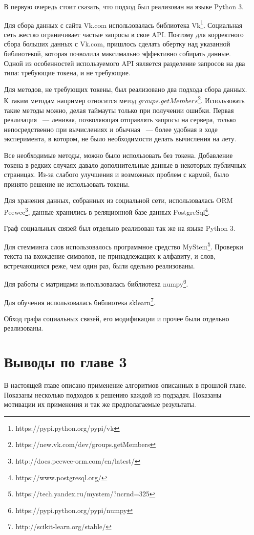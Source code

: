 \documentclass[annotation,times,page4]{itmo-student-thesis}
\begin{document}
В первую очередь стоит сказать, что подход был реализован на языке Python 3.

Для сбора данных с сайта Vk.com использовалась библиотека Vk\footnote{https://pypi.python.org/pypi/vk}. Социальная сеть жестко ограничивает частые запросы в свое API. Поэтому для корректного сбора больших данных с Vk.com, пришлось сделать обертку над указанной библиотекой, которая позволила максимально эффективно собирать данные. Одной из особенностей используемого API является разделение запросов на два типа: требующие токена, и не требующие.

Для методов, не требующих токены, был реализовано два подхода сбора данных. К таким методам например относится метод $groups.getMembers$\footnote{https://new.vk.com/dev/groups.getMembers}. Использовать такие методы можно, делая таймауты только при получении ошибки. Первая реализация ~--- ленивая, позволяющая отправлять запросы на сервера, только непосредственно при вычислениях и обычная ~--- более удобная в ходе эксперимента, в котором, не было необходимости делать вычисления на лету.

Все необходимые методы, можно было использовать без токена. Добавление токена в редких случаях давало дополнительные данные в некоторых публичных страницах. Из-за слабого улучшения и возможных проблем с кармой, было принято решение не использовать токены.

Для хранения данных, собранных из социальной сети, использовалась ORM Peewee\footnote{http://docs.peewee-orm.com/en/latest/}, данные хранились в реляционной базе данных PostgreSql\footnote{https://www.postgresql.org/}. 

Граф социальных связей был отдельно реализован так же на языке Python 3.

Для стемминга слов использовалось программное средство MyStem\footnote{https://tech.yandex.ru/mystem/?ncrnd=325}. Проверки текста на вхождение символов, не принадлежащих к алфавиту, и слов, встречающихся реже, чем один раз, были одельно реализованы.

Для работы с матрицами иcпользовалась библиотека numpy\footnote{https://pypi.python.org/pypi/numpy}.

Для обучения использовалась библиотека sklearn\footnote{http://scikit-learn.org/stable/}.

Обход графа социальных связей, его модификации и прочее были отдельно реализованы.

\section{Выводы по главе 3}
В настоящей главе описано применение алгоритмов описанных в прошлой главе. Показаны несколько подходов к решению каждой из подзадач. Показаны мотивации их применения и так же предполагаемые результаты. 
\end{document}
